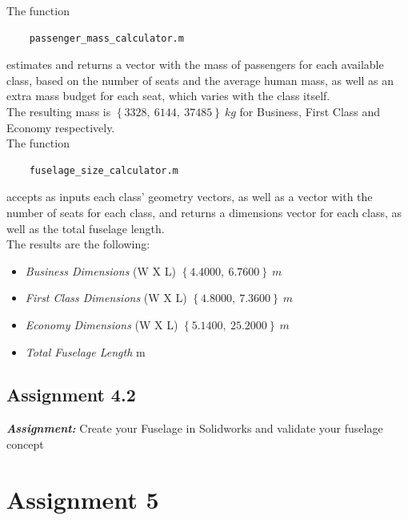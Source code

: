 \documentclass{article}
\begin{document}
The function \autocite{Airbus_replacement_repo}
\begin{verbatim}
    passenger_mass_calculator.m
\end{verbatim}

estimates and returns a vector with the mass of passengers for each available class, based on the number of seats and
the average human mass, as well as an extra mass budget for each seat, which varies with the class itself.\\ 

The resulting mass is $\left \{ 3328,  \  6144, \  37485 \right \} \ kg$ for Business, First Class and Economy respectively. \\ 

The function 
\begin{verbatim}
    fuselage_size_calculator.m
\end{verbatim}

accepts as inputs each class' geometry vectors, as well as a vector with the number of seats for each class, 
and returns a dimensions vector for each class, as well as the total fuselage length. \\ 

The results are the following:
\begin{itemize}
    \item \textit{Business Dimensions} (W X L)
        \subitem  $\left \{4.4000, \ 6.7600 \right \} \ m$
    \item \textit{First Class Dimensions} (W X L)
        \subitem  $\left \{4.8000, \ 7.3600 \right \} \ m$
    \item \textit{Economy Dimensions} (W X L)
        \subitem  $\left \{5.1400, \ 25.2000 \right \} \ m$
    \item \textit{Total Fuselage Length}
         m
\end{itemize}

\clearpage


\subsection{Assignment 4.2\label{Assignment_4.2}}

\textbf{\textit{Assignment:}} Create your Fuselage in Solidworks 
and validate your fuselage concept

\clearpage

\section{Assignment 5\label{Assignment_5}}
\end{document}

